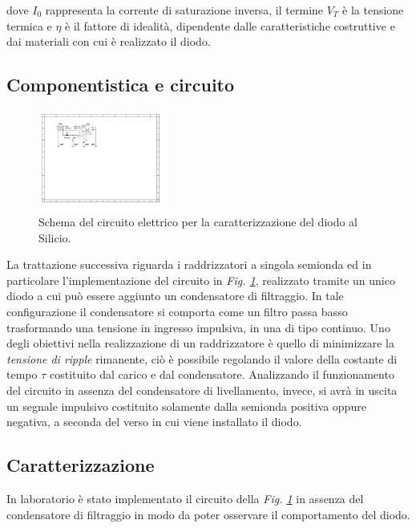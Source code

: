 \documentclass[journal]{IEEEtran}
\begin{document}
 dove $I_{0}$ rappresenta la corrente di saturazione inversa, il termine $V_{T}$ è la tensione termica e $\eta$ è il fattore di idealità, dipendente dalle caratteristiche costruttive e dai materiali con cui è realizzato il diodo.
\subsection{\textbf{Componentistica e circuito}}

\begin{figure}[H]%
\begin{center}
\includegraphics[width=0.38\textwidth]{sch-simulations/output/Diode-rectifier.pdf}
\caption{Schema del circuito elettrico per la caratterizzazione del diodo al Silicio.}
\label{fig:diode-rectifier}
\end{center}
\end{figure}
La trattazione successiva riguarda i raddrizzatori a singola semionda ed in particolare l'implementazione del circuito in \textit{Fig. \ref{fig:diode-rectifier}}, realizzato tramite un unico diodo a cui può essere aggiunto un condensatore di filtraggio. In tale configurazione il condensatore si comporta come un filtro passa basso trasformando una tensione in ingresso impulsiva, in una di tipo continuo. 
Uno degli obiettivi nella realizzazione di un raddrizzatore è quello di minimizzare la \textit{tensione di ripple} rimanente, ciò è possibile regolando il valore della costante di tempo $\tau$ costituito dal carico e dal condensatore.
Analizzando il funzionamento del circuito in assenza del condensatore di livellamento, invece, si avrà in uscita un segnale impulsivo costituito solamente dalla semionda positiva oppure negativa, a seconda del verso in cui viene installato il diodo.

\subsection{\textbf{Caratterizzazione}}
In laboratorio è stato implementato il circuito della \textit{Fig. \ref{fig:diode-rectifier}} in assenza del condensatore di filtraggio in modo da poter osservare il comportamento del diodo.
\end{document}
